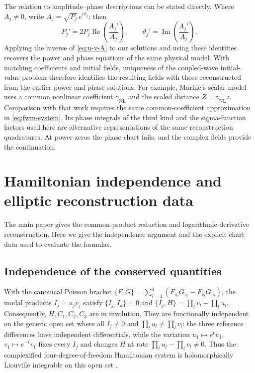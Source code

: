 \documentclass[11pt,a4paper]{article}
\begin{document}
The relation to amplitude--phase descriptions can be stated directly.
Where $A_j\ne0$, write $A_j=\sqrt{P_j}\,e^{i\vartheta_j}$; then
\begin{equation}
P_j'=2P_j\operatorname{Re}\!\left(\frac{A_j'}{A_j}\right),\qquad
\vartheta_j'=\operatorname{Im}\!\left(\frac{A_j'}{A_j}\right).
\label{eq:amplitude-phase-correspondence}
\end{equation}
Applying the inverse of \eqref{eq:u-v-A} to our solutions and using these identities recovers the power and phase equations of the same physical model.
With matching coefficients and initial fields, uniqueness of the coupled-wave initial-value problem therefore identifies the resulting fields with those reconstructed from the earlier power and phase solutions.
For example, Marhic's scalar model \cite[Eq.~(1)]{marhicAnalyticSolutionsPhases2013} uses a common nonlinear coefficient $\gamma_{\mathrm{NL}}$ and the scaled distance $Z=\gamma_{\mathrm{NL}}z$.
Comparison with that work requires the same common-coefficient approximation in \eqref{eq:fwm-system}.
Its phase integrals of the third kind and the sigma-function factors used here are alternative representations of the same reconstruction quadratures.
At power zeros the phase chart fails, and the complex fields provide the continuation.






\section{Hamiltonian independence and elliptic reconstruction data}\label{supp:sec:elliptic-data}
The main paper gives the common-product reduction and logarithmic-derivative reconstruction. Here we give the independence argument and the explicit chart data used to evaluate the formulas.
\subsection{Independence of the conserved quantities}
With the canonical Poisson bracket
$\{F,G\}=\sum_{l=1}^{4}(F_{u_l}G_{v_l}-F_{v_l}G_{u_l})$,
the modal products $I_j=u_jv_j$ satisfy $\{I_j,I_k\}=0$ and
$\{I_j,H\}=\prod_l v_l-\prod_l u_l$.
Consequently, $H,C_1,C_2,C_3$ are in involution.
They are functionally independent on the generic open set where all $I_j\ne0$ and $\prod_l u_l\ne\prod_l v_l$:
the three reference differences have independent differentials, while the variation
$u_1\mapsto e^t u_1$, $v_1\mapsto e^{-t}v_1$ fixes every $I_j$ and changes $H$ at rate $\prod_l u_l-\prod_l v_l\ne0$.
Thus the complexified four-degree-of-freedom Hamiltonian system is holomorphically Liouville integrable on this open set \cite{arnoldMathematicalMethodsClassical1989}.
\end{document}
